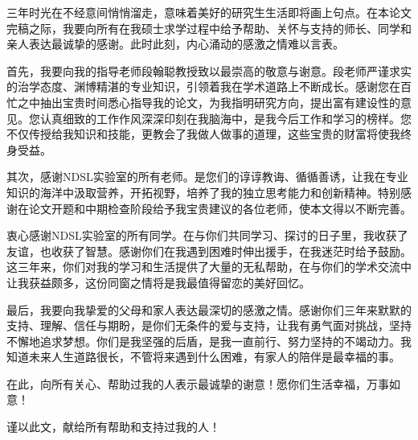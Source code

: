 
\thesisacknowledgement
三年时光在不经意间悄悄溜走，意味着美好的研究生生活即将画上句点。在本论文完稿之际，我要向所有在我硕士求学过程中给予帮助、关怀与支持的师长、同学和亲人表达最诚挚的感谢。此时此刻，内心涌动的感激之情难以言表。

首先，我要向我的指导老师段翰聪教授致以最崇高的敬意与谢意。段老师严谨求实的治学态度、渊博精湛的专业知识，引领着我在学术道路上不断成长。感谢您在百忙之中抽出宝贵时间悉心指导我的论文，为我指明研究方向，提出富有建设性的意见。您认真细致的工作作风深深印刻在我脑海中，是我今后工作和学习的榜样。您不仅传授给我知识和技能，更教会了我做人做事的道理，这些宝贵的财富将使我终身受益。

其次，感谢NDSL实验室的所有老师。是您们的谆谆教诲、循循善诱，让我在专业知识的海洋中汲取营养，开拓视野，培养了我的独立思考能力和创新精神。特别感谢在论文开题和中期检查阶段给予我宝贵建议的各位老师，使本文得以不断完善。

衷心感谢NDSL实验室的所有同学。在与你们共同学习、探讨的日子里，我收获了友谊，也收获了智慧。感谢你们在我遇到困难时伸出援手，在我迷茫时给予鼓励。这三年来，你们对我的学习和生活提供了大量的无私帮助，在与你们的学术交流中让我获益颇多，这份同窗之情将是我最值得留恋的美好回忆。

最后，我要向我挚爱的父母和家人表达最深切的感激之情。感谢你们三年来默默的支持、理解、信任与期盼，是你们无条件的爱与支持，让我有勇气面对挑战，坚持不懈地追求梦想。你们是我坚强的后盾，是我一直前行、努力坚持的不竭动力。我知道未来人生道路很长，不管将来遇到什么困难，有家人的陪伴是最幸福的事。

在此，向所有关心、帮助过我的人表示最诚挚的谢意！愿你们生活幸福，万事如意！

谨以此文，献给所有帮助和支持过我的人！
